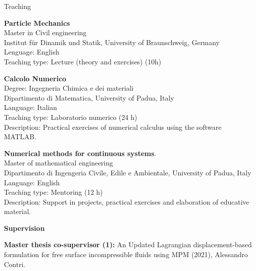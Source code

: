 \documentclass[letterpaper,english]{article}
\begin{document}
\begin{cv}{}
\begin{cvlist}{Teaching}
   \item[\footnotesize{2023 - 2024}] \textbf{Particle Mechanics}\\
    Master in Civil engineering\\
    Institut für Dinamik und Statik, University of Braunschweig, Germany\\
    Lenguage: English\\
    Teaching type: Lecture (theory and exercises) (10h)
     \item[\footnotesize{2022 - 2023}]  \textbf{Calcolo Numerico}\\
 Degree: Ingegneria Chimica e dei materiali\\
 Dipartimento di Matematica, University of Padua, Italy\\
 Language: Italian\\
 Teaching type: Laboratorio numerico (24 h)\\
 Description: Practical exercises of numerical calculus using the software MATLAB.
	\item[\footnotesize{2022 - 2023}] \textbf{Numerical methods for continuous systems}.\\
 Master of mathematical engineering\\
 Dipartimento di Ingengeria Civile, Edile e Ambientale, University of Padua, Italy\\
Language: English\\
Teaching type: Mentoring (12 h)\\
Description: Support in projects, practical exercises and elaboration of educative material.
\end{cvlist}
\vspace{0.25cm}
\large{\textbf{Supervision}}\\
\normalsize

\noindent \textbf{Master thesis co-supervisor (1):} An Updated Lagrangian displacement-based formulation for free surface incompressible fluids using MPM (2021), Alessandro Contri.
\vspace{0.25cm}


\end{cv}
\end{document}
